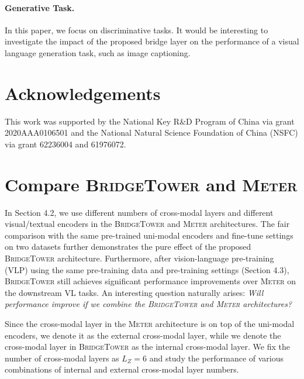 \documentclass[letterpaper]{article} %
\newcommand{\methodname}[0]{\textsc{BridgeTower}}
\newcommand{\metername}[0]{\textsc{Meter}}
\begin{document}
\paragraph{Generative Task.}
In this paper, we focus on discriminative tasks. 
It would be interesting to investigate the impact of the proposed bridge layer on the performance of a visual language generation task, such as image captioning.

\section*{Acknowledgements}
This work was supported by the National Key R\&D Program of China via grant 2020AAA0106501 and the National Natural Science Foundation of China (NSFC) via grant 62236004 and 61976072.

\appendix


\section{Compare \methodname{} and \metername{}}
\label{appendix:comparision}

In Section 4.2, we use different numbers of cross-modal layers and different visual/textual encoders in the \methodname{} and \metername{} architectures.
The fair comparison with the same pre-trained uni-modal encoders and fine-tune settings on two datasets further demonstrates the pure effect of the proposed \methodname{} architecture. 
Furthermore, after vision-language pre-training (VLP) using the same pre-training data and pre-training settings (Section 4.3), \methodname{} still achieves significant performance improvements over \metername{} on the downstream VL tasks.
An interesting question naturally arises: 
\textit{Will performance improve if we combine the \methodname{} and \metername{} architectures?}

Since the cross-modal layer in the \metername{} architecture is on top of the uni-modal encoders, we denote it as the {external} cross-modal layer, while we denote the cross-modal layer in \methodname{} as the {internal} cross-modal layer.
We fix the number of cross-modal layers as $L_Z=6$ and study the performance of various combinations of {internal} and {external} cross-modal layer numbers.
\end{document}
